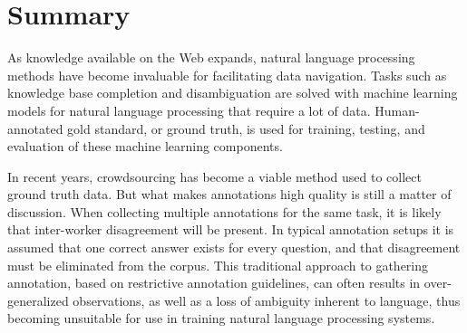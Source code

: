 \manualmark
{}

\chapter*{Summary}

As knowledge available on the Web expands, natural language processing methods have become invaluable for facilitating data navigation. Tasks such as knowledge base completion and disambiguation are solved with machine learning models for natural language processing that require a lot of data. Human-annotated gold standard, or ground truth, is used for training, testing, and evaluation of these machine learning components.

In recent years, crowdsourcing has become a viable method used to collect ground truth data. But what makes annotations high quality is still a matter of discussion. When collecting multiple annotations for the same task, it is likely that inter-worker disagreement will be present. In typical annotation setups it is assumed that one correct answer exists for every question, and that disagreement must be eliminated from the corpus. This traditional approach to gathering annotation, based on restrictive annotation guidelines, can often results in over-generalized observations, as well as a loss of ambiguity inherent to language, thus becoming unsuitable for use in training natural language processing systems. 

